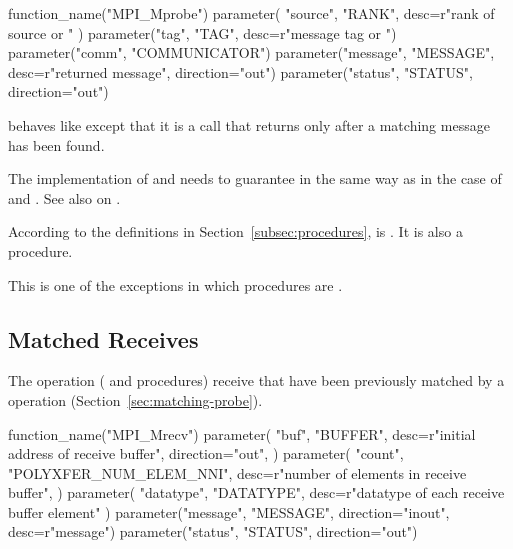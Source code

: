 \begin{mpi-binding}
    function_name("MPI_Mprobe")
    parameter(
        "source", "RANK", desc=r"rank of source or "
    )
    parameter("tag", "TAG", desc=r"message tag or ")
    parameter("comm", "COMMUNICATOR")
    parameter("message", "MESSAGE", desc=r"returned message", direction="out")
    parameter("status", "STATUS", direction="out")
\end{mpi-binding}


 behaves like  except that it is a
 call that returns only after a matching message has been
found.

The implementation of  and  needs
to guarantee  in the same way as in the case of
 and .
See also  on .

According to the definitions in Section~\ref{subsec:procedures}, 
is . It is also a  procedure.
\begin{users}
This is one of the exceptions in which  procedures are .
\end{users}

\subsection{Matched Receives}
\label{sec:matched-receive}

The  operation ( and  procedures) receive
 that have been previously matched by a  operation
(Section~\ref{sec:matching-probe}).

\begin{mpi-binding}
    function_name("MPI_Mrecv")
    parameter(
        "buf",
        "BUFFER",
        desc=r"initial address of receive buffer",
        direction="out",
    )
    parameter(
        "count",
        "POLYXFER_NUM_ELEM_NNI",
        desc=r"number of elements in receive buffer",
    )
    parameter(
        "datatype", "DATATYPE", desc=r"datatype of each receive buffer element"
    )
    parameter("message", "MESSAGE", direction="inout", desc=r"message")
    parameter("status", "STATUS", direction="out")
\end{mpi-binding}

